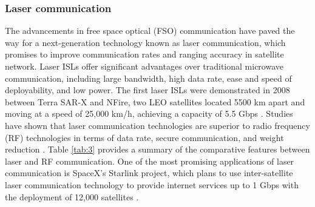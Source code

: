 \documentclass[lettersize,journal]{IEEEtran}
\begin{document}
\subsubsection*{Laser communication} 

The advancements in free space optical (FSO) communication have paved the way for a next-generation technology known as laser communication, which promises to improve communication rates and ranging accuracy in satellite network. Laser ISLs offer significant advantages over traditional microwave communication, including large bandwidth, high data rate, ease and speed of deployability, and low power. The first laser ISLs were demonstrated in 2008 between Terra SAR-X and NFire, two LEO satellites located 5500 km apart and moving at a speed of 25,000 km/h, achieving a capacity of 5.5 Gbps \cite{RN201}. Studies have shown that laser communication technologies are superior to radio frequency (RF) technologies in terms of data rate, secure communication, and weight reduction \cite{RN204,RN205,RN202,RN203}. Table \ref{tab:3} provides a summary of the comparative features between laser and RF communication. One of the most promising applications of laser communication is SpaceX's Starlink project, which plans to use inter-satellite laser communication technology to provide internet services up to 1 Gbps with the deployment of 12,000 satellites \cite{SpaceXNews}.
\end{document}
